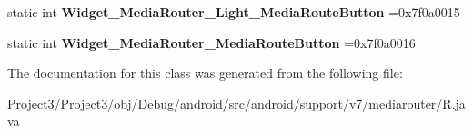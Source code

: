 \begin{DoxyCompactItemize}
\item 
\mbox{\label{classandroid_1_1support_1_1v7_1_1mediarouter_1_1R_1_1style_a6d1edf3e16c59076606513778152b0ff}} 
static int {\bfseries Widget\+\_\+\+Media\+Router\+\_\+\+Light\+\_\+\+Media\+Route\+Button} =0x7f0a0015
\item 
\mbox{\label{classandroid_1_1support_1_1v7_1_1mediarouter_1_1R_1_1style_a41e34123ff7bb8bab82ae65fe68e41bc}} 
static int {\bfseries Widget\+\_\+\+Media\+Router\+\_\+\+Media\+Route\+Button} =0x7f0a0016
\end{DoxyCompactItemize}


The documentation for this class was generated from the following file\+:\begin{DoxyCompactItemize}
\item 
Project3/\+Project3/obj/\+Debug/android/src/android/support/v7/mediarouter/R.\+java\end{DoxyCompactItemize}
